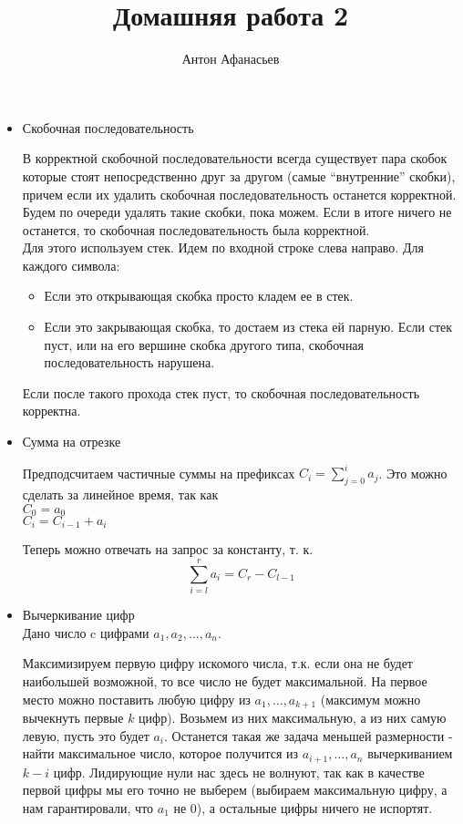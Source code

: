 \documentclass[10pt]{article}
\begin{document}
\title{Домашняя работа 2}
\author{Антон Афанасьев}
\maketitle

\begin{itemize}

\item Скобочная последовательность 

В корректной скобочной последовательности всегда существует пара скобок которые стоят непосредственно друг за другом (самые ``внутренние'' скобки), причем если их удалить скобочная последовательность останется корректной. Будем по очереди удалять такие скобки, пока можем. Если в итоге ничего не останется, то скобочная последовательность была корректной.\\
Для этого используем стек. Идем по входной строке слева направо. Для каждого символа:
\begin{itemize}
\item Если это открывающая скобка просто кладем ее в стек.
\item Если это закрывающая скобка, то достаем из стека ей парную. Если стек пуст, или на его вершине скобка другого типа, скобочная последовательность нарушена.
\end{itemize}
Если после такого прохода стек пуст, то скобочная последовательность корректна.

\item Сумма на отрезке

Предподсчитаем частичные суммы на префиксах $C_i = \sum_{j=0}^i a_j$. Это можно сделать за линейное время, так как \\
$C_0=a_0$\\
$C_i = C_{i-1} + a_i$

Теперь можно отвечать на запрос за константу, т. к.
$$\sum_{i=l}^r a_i = C_r - C_{l-1}$$

\item Вычеркивание цифр\\
Дано число c цифрами $a_1, a_2, \ldots, a_n$.

Максимизируем первую цифру искомого числа, т.к. если она не будет наибольшей возможной, то все число не будет максимальной. На первое место можно поставить любую цифру из $a_1, \ldots, a_{k+1}$ (максимум можно вычекнуть первые $k$ цифр). Возьмем из них максимальную, а из них самую левую, пусть это будет $a_i$. Останется такая же задача меньшей размерности - найти максимальное число, которое получится из $a_{i+1}, \ldots, a_n$ вычеркиванием $k-i$ цифр. Лидирующие нули нас здесь не волнуют, так как в качестве первой цифры мы его точно не выберем (выбираем максимальную цифру, а нам гарантировали, что $a_1$ не 0), а остальные цифры ничего не испортят.


\end{itemize}
\end{document}
